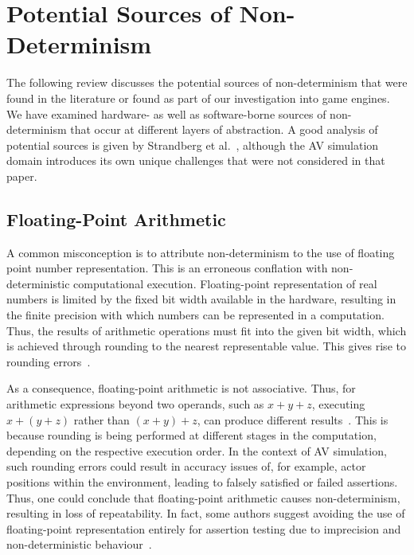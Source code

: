 \section{Potential Sources of Non-Determinism} \label{s:nondeterminisimSources}

The following review discusses the potential sources of non-determinism that were found in the literature or found as part of our investigation into game engines. We have examined hardware- as well as software-borne sources of non-determinism that occur at different layers of abstraction. 
%
A good analysis of potential sources is given by Strandberg et al.~\cite{intermittently-failing-tests}, although the AV simulation domain introduces its own unique challenges that were not considered in that paper.

\medskip

\subsection{Floating-Point Arithmetic}

A common misconception is to attribute non-determinism to the use of floating point number representation. This is an erroneous conflation with non-deterministic computational execution.  
%
Floating-point representation of real numbers is limited by the fixed bit width available in the hardware, resulting in the finite precision with which numbers can be represented in a computation. 
Thus, the results of arithmetic operations must fit into the given bit width, which is achieved through rounding to the nearest representable value. This gives rise to rounding errors~\cite{FloatingPointsBook,goldberg1991every}. %

As a consequence, floating-point arithmetic is not associative. Thus, for arithmetic expressions beyond two operands, such as $x+y+z$, executing $x+(y+z)$ rather than $(x+y)+z$, can produce different results~\cite{Kapre2007}. This is because rounding is being performed at different stages in the computation, depending on the respective execution order. 
%
In the context of AV simulation, such rounding errors could result in accuracy issues of, for example, actor positions within the environment, leading to falsely satisfied or failed assertions.
%
Thus, one could conclude that floating-point arithmetic causes non-determinism, resulting in loss of repeatability. In fact, some authors suggest avoiding the use of floating-point representation entirely for assertion testing due to imprecision and non-deterministic behaviour~\cite{empirical-analysis-of-flaky-tests}. 

